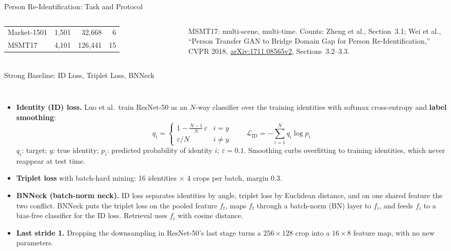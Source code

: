 \begin{frame}{Person Re-Identification: Task and Protocol}
\begin{columns}[T,onlytextwidth]
{\begin{tabular}{lrrr}
        \midrule
        Market-1501 & 1,501 & 32,668 & 6 \\
        MSMT17 & 4,101 & 126,441 & 15 \\
        \bottomrule
      \end{tabular}\par}
      \vspace{0.2em}
      {\scriptsize MSMT17: multi-scene, multi-time. Counts: Zheng et al., Section~3.1; Wei et al., ``Person Transfer GAN to Bridge Domain Gap for Person Re-Identification,'' CVPR 2018, \href{https://arxiv.org/abs/1711.08565v2}{arXiv:1711.08565v2}, Sections~3.2--3.3.\par}
  \end{columns}
\end{frame}

\begin{frame}{Strong Baseline: ID Loss, Triplet Loss, BNNeck}
  \begin{columns}[T,onlytextwidth]
      \begin{itemize}\scriptsize\itemsep0.2em
        \item \textbf{Identity (ID) loss.} Luo et al.\ train ResNet-50 as an $N$-way classifier over the training identities with softmax cross-entropy and \textbf{label smoothing}:
        \[ q_i = \begin{cases} 1-\frac{N-1}{N}\,\varepsilon & i = y\\ \varepsilon/N & i \neq y \end{cases} \qquad \mathcal{L}_{\mathrm{ID}} = -\sum_{i=1}^{N} q_i \log p_i \]
        $q_i$: target; $y$: true identity; $p_i$: predicted probability of identity $i$; $\varepsilon = 0.1$. Smoothing curbs overfitting to training identities, which never reappear at test time.
        \item \textbf{Triplet loss} with batch-hard mining: 16 identities $\times$ 4 crops per batch, margin 0.3.
        \item \textbf{BNNeck (batch-norm neck).} ID loss separates identities by angle, triplet loss by Euclidean distance, and on one shared feature the two conflict. BNNeck puts the triplet loss on the pooled feature $f_t$, maps $f_t$ through a batch-norm (BN) layer to $f_i$, and feeds $f_i$ to a bias-free classifier for the ID loss. Retrieval uses $f_i$ with cosine distance.
        \item \textbf{Last stride 1.} Dropping the downsampling in ResNet-50's last stage turns a $256\times128$ crop into a $16\times8$ feature map, with no new parameters.

\end{itemize}
\end{columns}
\end{frame}
